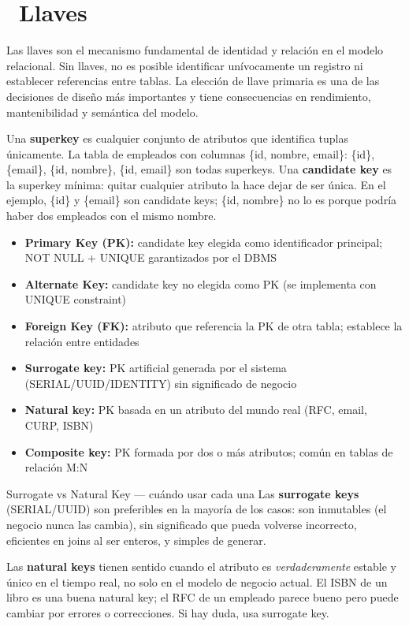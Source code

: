 \section[Llaves]{~Llaves}

Las llaves son el mecanismo fundamental de identidad y relación en el modelo relacional.
Sin llaves, no es posible identificar unívocamente un registro ni establecer referencias entre tablas.
La elección de llave primaria es una de las decisiones de diseño más importantes y tiene consecuencias en rendimiento, mantenibilidad y semántica del modelo.

Una \textbf{superkey} es cualquier conjunto de atributos que identifica tuplas únicamente.
La tabla de empleados con columnas \{id, nombre, email\}: \{id\}, \{email\}, \{id, nombre\}, \{id, email\} son todas superkeys.
Una \textbf{candidate key} es la superkey mínima: quitar cualquier atributo la hace dejar de ser única.
En el ejemplo, \{id\} y \{email\} son candidate keys; \{id, nombre\} no lo es porque podría haber dos empleados con el mismo nombre.

\begin{itemize}
  \item \textbf{Primary Key (PK):} candidate key elegida como identificador principal; NOT NULL + UNIQUE garantizados por el DBMS
  \item \textbf{Alternate Key:} candidate key no elegida como PK (se implementa con UNIQUE constraint)
  \item \textbf{Foreign Key (FK):} atributo que referencia la PK de otra tabla; establece la relación entre entidades
  \item \textbf{Surrogate key:} PK artificial generada por el sistema (SERIAL/UUID/IDENTITY) sin significado de negocio
  \item \textbf{Natural key:} PK basada en un atributo del mundo real (RFC, email, CURP, ISBN)
  \item \textbf{Composite key:} PK formada por dos o más atributos; común en tablas de relación M:N
\end{itemize}

\begin{tipbox}{Surrogate vs Natural Key — cuándo usar cada una}
Las \textbf{surrogate keys} (SERIAL/UUID) son preferibles en la mayoría de los casos:
son inmutables (el negocio nunca las cambia), sin significado que pueda volverse incorrecto, eficientes en joins al ser enteros, y simples de generar.

Las \textbf{natural keys} tienen sentido cuando el atributo es \emph{verdaderamente} estable y único en el tiempo real, no solo en el modelo de negocio actual.
El ISBN de un libro es una buena natural key; el RFC de un empleado parece bueno pero puede cambiar por errores o correcciones.
Si hay duda, usa surrogate key.
\end{tipbox}


